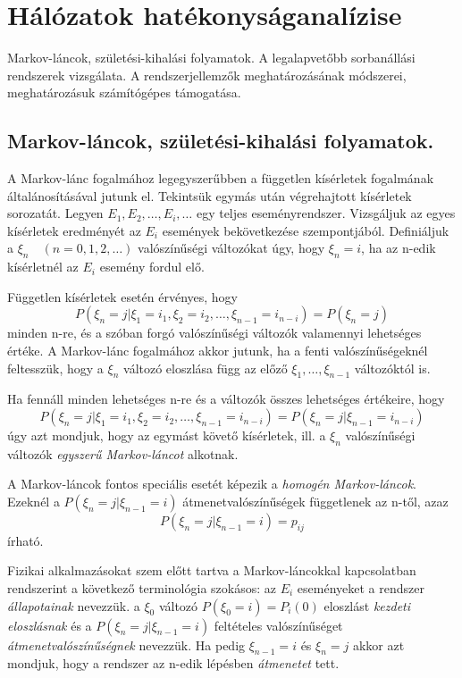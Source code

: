 \section{Hálózatok hatékonyságanalízise}
{\footnotesize Markov-láncok, születési-kihalási folyamatok. A legalapvetőbb sorbanállási rendszerek vizsgálata. A rendszerjellemzők meghatározásának módszerei, meghatározásuk számítógépes támogatása.}
\subsection{Markov-láncok, születési-kihalási folyamatok.}
A Markov-lánc fogalmához legegyszerűbben a független kísérletek fogalmának általánosításával jutunk el. Tekintsük egymás után végrehajtott  kísérletek sorozatát. Legyen $E_1,E_2,\dots,E_i,\dots$ egy teljes eseményrendszer. Vizsgáljuk az egyes kísérletek eredményét az $E_i$ események bekövetkezése szempontjából. Definiáljuk a $\xi_n\quad(n=0,1,2,\dots)$ valószínűségi változókat úgy, hogy $\xi_n=i$, ha az n-edik kísérletnél az $E_i$ esemény fordul elő.

Független kísérletek esetén érvényes, hogy
$$P(\xi_n=j|\xi_1=i_1,\xi_2=i_2,\dots,\xi_{n-1}=i_{n-i})=P(\xi_n=j)$$
minden n-re, és a szóban forgó valószínűségi változók valamennyi lehetséges értéke. A Markov-lánc fogalmához akkor jutunk, ha a fenti valószínűségeknél feltesszük, hogy a $\xi_n$ változó eloszlása függ az előző $\xi_1,\dots,\xi_{n-1}$ változóktól is.

Ha fennáll minden lehetséges n-re és a változók összes lehetséges értékeire, hogy
$$P(\xi_n=j|\xi_1=i_1,\xi_2=i_2,\dots,\xi_{n-1}=i_{n-i})=P(\xi_n=j|\xi_{n-1}=i_{n-i})$$
úgy azt mondjuk, hogy az egymást követő kísérletek, ill. a $\xi_n$ valószínűségi változók \emph{egyszerű Markov-láncot} alkotnak.

A Markov-láncok fontos speciális esetét képezik a \emph{homogén Markov-láncok}. Ezeknél a  $P(\xi_n=j|\xi_{n-1}=i)$ átmenetvalószínűségek  függetlenek az n-től, azaz
$$P(\xi_n=j|\xi_{n-1}=i)=p_{ij}$$
írható.

Fizikai alkalmazásokat szem előtt tartva a Markov-láncokkal kapcsolatban rendszerint a következő terminológia szokásos: az $E_i$ eseményeket a rendszer \emph{állapotainak} nevezzük. a $\xi_0$ változó $P(\xi_0=i)=P_i(0)$ eloszlást \emph{kezdeti eloszlásnak} és a $P(\xi_n=j|\xi_{n-1}=i)$ feltételes valószínűséget \emph{átmenetvalószínűségnek} nevezzük. Ha pedig $\xi_{n-1}=i$ és $\xi_n=j$ akkor azt mondjuk, hogy a rendszer az n-edik lépésben \emph{átmenetet} tett.

